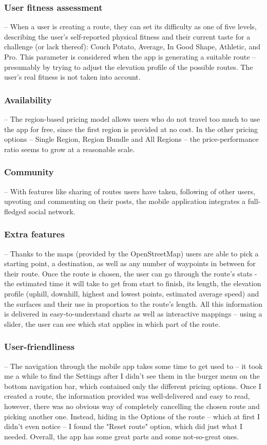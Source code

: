 \subsubsection{User fitness assessment} -- When a user is creating a route, they can set its difficulty as one of five levels, 
describing the user's self-reported physical fitness and their current taste for a challenge (or lack thereof): Couch Potato, Average, In Good Shape, Athletic, and Pro.
This parameter is considered when the app is generating a suitable route -- presumably by trying to adjust the elevation profile of the possible routes.
The user's real fitness is not taken into account.
\subsubsection{Availability} -- The region-based pricing model allows users who do not travel too much to use the app for free,
since the first region is provided at no cost.
In the other pricing options -- Single Region, Region Bundle and All Regions -- the price-performance ratio seems to grow at a reasonable scale.
\subsubsection{Community} -- With features like sharing of routes users have taken, following of other users, upvoting and commenting on their posts, the mobile application integrates a full-fledged social network.
\subsubsection{Extra features} -- Thanks to the maps (provided by the OpenStreetMap) users are able to pick a starting point, a destination, as well as any number of waypoints in between for their route.
Once the route is chosen, the user can go through the route's stats - the estimated time it will take to get from start to finish, its length, the elevation profile (uphill, downhill, highest and lowest points, estimated average speed) and the surfaces and their use in proportion to the route's length.
All this information is delivered in easy-to-understand charts as well as interactive mappings -- using a slider, the user can see which stat applies in which part of the route.
\subsubsection{User-friendliness} -- The navigation through the mobile app takes some time to get used to -- it took me a while to find the Settings after I didn't see them in the burger menu on the bottom navigation bar, which contained only the different pricing options.
Once I created a route, the information provided was well-delivered and easy to read, however, there was no obvious way of completely cancelling the chosen route and picking another one.
Instead, hiding in the Options of the route -- which at first I didn't even notice -- I found the "Reset route" option, which did just what I needed.
Overall, the app has some great parts and some not-so-great ones.
